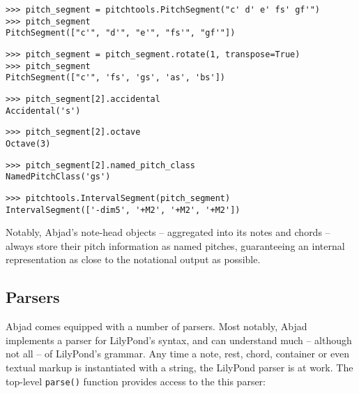 \begin{abjadbookoutput}
\begin{singlespacing}
\vspace{-0.5\baselineskip}
\begin{verbatim}
>>> pitch_segment = pitchtools.PitchSegment("c' d' e' fs' gf'")
>>> pitch_segment
PitchSegment(["c'", "d'", "e'", "fs'", "gf'"])
\end{verbatim}
\begin{verbatim}
>>> pitch_segment = pitch_segment.rotate(1, transpose=True)
>>> pitch_segment
PitchSegment(["c'", 'fs', 'gs', 'as', 'bs'])
\end{verbatim}
\begin{verbatim}
>>> pitch_segment[2].accidental
Accidental('s')
\end{verbatim}
\begin{verbatim}
>>> pitch_segment[2].octave
Octave(3)
\end{verbatim}
\begin{verbatim}
>>> pitch_segment[2].named_pitch_class
NamedPitchClass('gs')
\end{verbatim}
\begin{verbatim}
>>> pitchtools.IntervalSegment(pitch_segment)
IntervalSegment(['-dim5', '+M2', '+M2', '+M2'])
\end{verbatim}
\end{singlespacing}
\end{abjadbookoutput}

\noindent Notably, Abjad's note-head objects -- aggregated into its notes and
chords -- always store their pitch information as named pitches, guaranteeing
an internal representation as close to the notational output as possible.

\subsection{Parsers}
\label{ssec:parsers}

Abjad comes equipped with a number of parsers. Most notably, Abjad implements a
parser for LilyPond's syntax, and can understand much -- although not all -- of
LilyPond's grammar. Any time a note, rest, chord, container or even textual
markup is instantiated with a string, the LilyPond parser is at work. The
top-level \texttt{parse()} function provides access to the this parser:

\begin{comment}
<abjad>
string = r"\new Staff { c'4 ( \p \< d'4 e'4 f'4 ) \! }"
result = parse(string)
show(result)
</abjad>
\end{comment}

